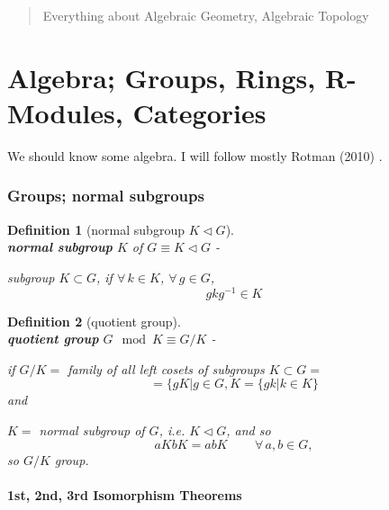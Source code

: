 \documentclass[10pt]{amsart}
\newtheorem{definition}{Definition}
\begin{document}
\begin{multicols*}{2}

  
\setcounter{tocdepth}{1}
\tableofcontents



\begin{abstract}
Everything about Algebraic Geometry, Algebraic Topology

\end{abstract}

\part{Algebra; Groups, Rings, R-Modules, Categories}

We should know some algebra.  I will follow mostly Rotman (2010) \cite{JRotman2010}.  

\section{Groups; normal subgroups}  

\begin{definition}[normal subgroup $K \lhd G$] \qquad \, \\
\textbf{normal subgroup} $K$ of $G \equiv K \lhd G$   - 

subgroup $K\subset G$, if $\forall \, k \in K$, $\forall \, g \in G$, 
\[
gkg^{-1} \in K
\]
\end{definition}

\begin{definition}[quotient group] \qquad \, \\
\textbf{quotient group} $G\mod{K} \equiv G/K$ -  

if $G/K = $ family of all left cosets of subgroups $K\subset G = $
\[ 
= \lbrace gK | g\in G, K = \lbrace gk | k \in K \rbrace 
\]
and 

$K = $ normal subgroup of $G$, i.e. $K \lhd G$, and so 
\[
aK bK = abK \qquad \, \forall \, a,b \in G, 
\]
so $G/K $ group.  
\end{definition}



\subsection{1st, 2nd, 3rd Isomorphism Theorems}


\end{multicols*}
\end{document}
